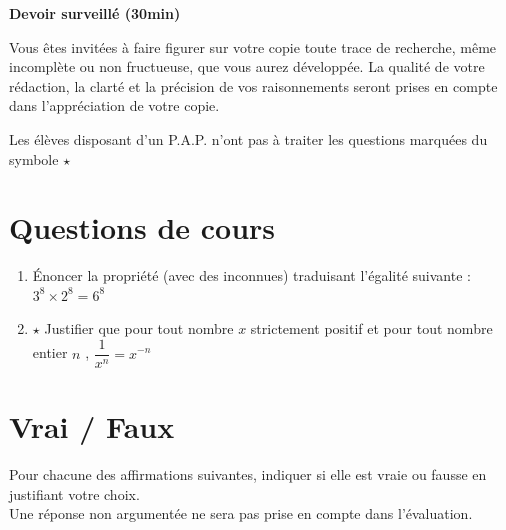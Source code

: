 \documentclass[oneside,12pt]{exam}          %
\begin{document}
\footer{}{\footnotesize \etablissement}{}

\hrulefill\raisebox{-1.9pt}{\quad\decofourleft~\decosix~\decofourright \quad}\hrulefill

\begin{center}
	\textbf{\large Devoir surveillé  (30min)}
\end{center}
\vspace{-5pt}
Vous êtes invité\textperiodcentered e\textperiodcentered s à faire figurer sur votre copie toute trace de recherche, même incomplète ou non fructueuse, que vous aurez développée. La qualité de votre rédaction, la clarté et la précision de vos raisonnements seront prises en compte dans l’appréciation de votre copie.

Les élèves disposant d'un P.A.P. n'ont pas à traiter les questions marquées du symbole $\star$

\vspace{-8pt}\hrulefill\raisebox{-1.9pt}{\quad\decofourleft~\decosix~\decofourright \quad}\hrulefill
\vspace{5pt}



\section{Questions de cours}

\begin{enumerate}
	\item Énoncer la propriété (avec des inconnues) traduisant l'égalité suivante : $3^8 \times 2^8 = 6^8$
	\item $\star$ Justifier que pour tout nombre $x$ strictement positif et pour tout nombre entier $n$ , $\dfrac{1}{x^n} = x^{-n}$
\end{enumerate}



\section{Vrai / Faux}
Pour chacune des affirmations suivantes, indiquer si elle est vraie ou fausse en justifiant votre choix. \\
Une réponse non argumentée ne sera pas prise en compte dans l’évaluation.
\end{document}
